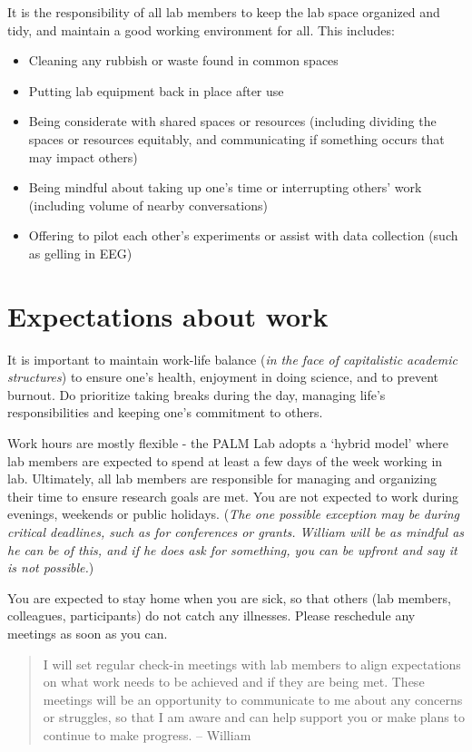 \documentclass[
]{book}
\providecommand{\tightlist}{%
  \setlength{\itemsep}{0pt}\setlength{\parskip}{0pt}}
\theoremstyle{definition}
\theoremstyle{definition}
\theoremstyle{definition}
\theoremstyle{definition}
\theoremstyle{remark}
\begin{document}
It is the responsibility of all lab members to keep the lab space organized and tidy, and maintain a good working environment for all. This includes:

\begin{itemize}
\tightlist
\item
  Cleaning any rubbish or waste found in common spaces
\item
  Putting lab equipment back in place after use
\item
  Being considerate with shared spaces or resources (including dividing the spaces or resources equitably, and communicating if something occurs that may impact others)
\item
  Being mindful about taking up one's time or interrupting others' work (including volume of nearby conversations)
\item
  Offering to pilot each other's experiments or assist with data collection (such as gelling in EEG)
\end{itemize}

\hypertarget{lab-work}{%
\section{Expectations about work}\label{lab-work}}

It is important to maintain work-life balance (\emph{in the face of capitalistic academic structures}) to ensure one's health, enjoyment in doing science, and to prevent burnout. Do prioritize taking breaks during the day, managing life's responsibilities and keeping one's commitment to others.

Work hours are mostly flexible - the PALM Lab adopts a `hybrid model' where lab members are expected to spend at least a few days of the week working in lab. Ultimately, all lab members are responsible for managing and organizing their time to ensure research goals are met. You are not expected to work during evenings, weekends or public holidays. (\emph{The one possible exception may be during critical deadlines, such as for conferences or grants. William will be as mindful as he can be of this, and if he does ask for something, you can be upfront and say it is not possible.})

You are expected to stay home when you are sick, so that others (lab members, colleagues, participants) do not catch any illnesses. Please reschedule any meetings as soon as you can.

\begin{quote}
I will set regular check-in meetings with lab members to align expectations on what work needs to be achieved and if they are being met. These meetings will be an opportunity to communicate to me about any concerns or struggles, so that I am aware and can help support you or make plans to continue to make progress. -- William
\end{quote}
\end{document}
